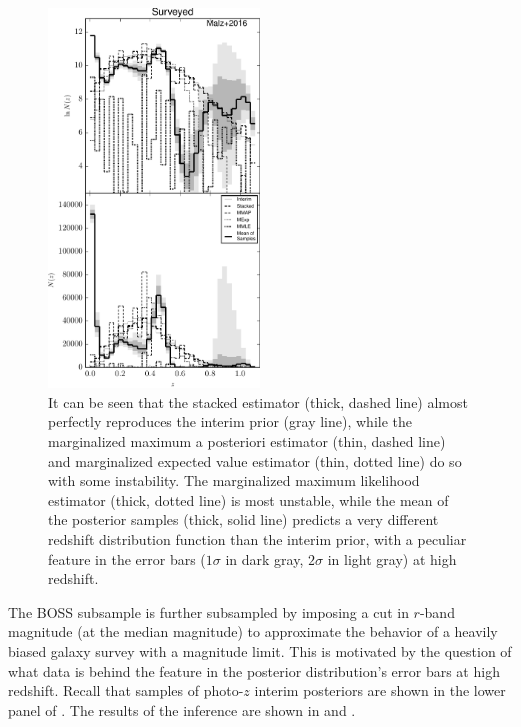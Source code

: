 \begin{figure}
	\includegraphics[width=0.5\textwidth]{figures/chippr/boss_comps.pdf}
	\caption{It can be seen that the stacked estimator (thick, dashed line) almost perfectly reproduces the interim prior (gray line), while the marginalized maximum a posteriori estimator (thin, dashed line) and marginalized expected value estimator (thin, dotted line) do so with some instability.  
		The marginalized maximum likelihood estimator (thick, dotted line) is most unstable, while the mean of the posterior samples (thick, solid line) predicts a very different redshift distribution function than the interim prior, with a peculiar feature in the error bars ($1\sigma$ in dark gray, $2\sigma$ in light gray) at high redshift.}
\end{figure}

The BOSS subsample is further subsampled by imposing a cut in $r$-band magnitude (at the median magnitude) to approximate the behavior of a heavily biased galaxy survey with a magnitude limit.  
This is motivated by the question of what data is behind the feature in the posterior distribution's error bars at high redshift.  
Recall that samples of photo-$z$ interim posteriors are shown in the lower panel of .  
The results of the inference are shown in  and .  

